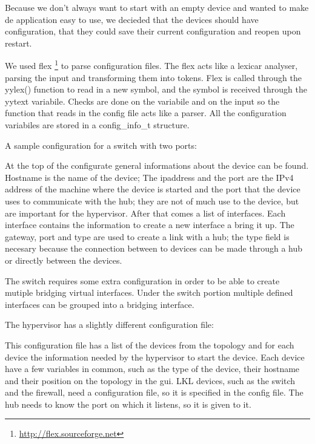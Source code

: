 Because we don't always want to start with an empty device and wanted to make de application easy to use, we decieded that the
devices should have configuration, that they could save their current configuration and reopen upon restart. 

We used flex \footnote{\url{http://flex.sourceforge.net}} to parse configuration files. The flex acts like a lexicar analyser, 
parsing the input and transforming them into tokens. Flex is called through the yylex() function to read in a new symbol, and the
symbol is received through the yytext variabile. Checks are done on the variabile and on the input so the function that reads in 
the config file acts like a parser. All the configuration variabiles are stored in a config_info_t structure.

A sample configuration for a switch with two ports:
\lstset{language=inform,caption=Example switch configuration file,label=lst:dconf}


At the top of the configurate general informations about the device can be found. Hostname is the name of the device;
The ipaddress and the port are the IPv4 address of the machine where the device is started and the port that the device
uses to communicate with the hub; they are not of much use to the device, but are important for the hypervisor.
After that comes a list of interfaces.	Each interface contains the information to create a new interface a bring it up.
The gateway, port and type are used to create a link with a hub; the type field is necesary because the connection between
to devices can be made through a hub or directly between the devices. 

The switch requires some extra configuration in order to be able to create mutiple bridging virtual interfaces. 
Under the switch portion multiple defined interfaces can be grouped into a bridging interface.

The hypervisor has a slightly different configuration file:
\lstset{language=inform,caption=Example hypervisor configuration file,label=lst:hconf}

This configuration file has a list of the devices from the topology and for each device the information needed by the hypervisor to
start the device. Each device have a few variables in common, such as the type of the device, their hostname and their position on
the topology in the gui. LKL devices, such as the switch and the firewall, need a configuration file, so it is specified in the
config file. The hub needs to know the port on which it listens, so it is given to it.

